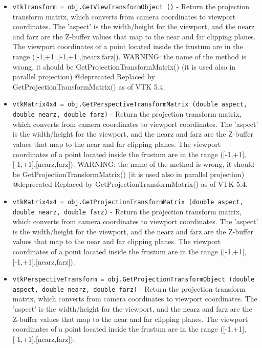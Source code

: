 \begin{itemize}
\item  \verb|vtkTransform = obj.GetViewTransformObject ()| -  Return the projection transform matrix, which converts from camera
 coordinates to viewport coordinates.  The 'aspect' is the
 width/height for the viewport, and the nearz and farz are the
 Z-buffer values that map to the near and far clipping planes.
 The viewport coordinates of a point located inside the frustum are in the
 range ([-1,+1],[-1,+1],[nearz,farz]).
 WARNING: the name of the method is wrong, it should be
 GetProjectionTransformMatrix() (it is used also in parallel projection)
 @deprecated Replaced by GetProjectionTransformMatrix() as of VTK 5.4.

\item  \verb|vtkMatrix4x4 = obj.GetPerspectiveTransformMatrix (double aspect, double nearz, double farz)| -  Return the projection transform matrix, which converts from camera
 coordinates to viewport coordinates.  The 'aspect' is the
 width/height for the viewport, and the nearz and farz are the
 Z-buffer values that map to the near and far clipping planes.
 The viewport coordinates of a point located inside the frustum are in the
 range ([-1,+1],[-1,+1],[nearz,farz]).
 WARNING: the name of the method is wrong, it should be
 GetProjectionTransformMatrix() (it is used also in parallel projection)
 @deprecated Replaced by GetProjectionTransformMatrix() as of VTK 5.4.

\item  \verb|vtkMatrix4x4 = obj.GetProjectionTransformMatrix (double aspect, double nearz, double farz)| -  Return the projection transform matrix, which converts from camera
 coordinates to viewport coordinates.  The 'aspect' is the
 width/height for the viewport, and the nearz and farz are the
 Z-buffer values that map to the near and far clipping planes.
 The viewport coordinates of a point located inside the frustum are in the
 range ([-1,+1],[-1,+1],[nearz,farz]).

\item  \verb|vtkPerspectiveTransform = obj.GetProjectionTransformObject (double aspect, double nearz, double farz)| -  Return the projection transform matrix, which converts from camera
 coordinates to viewport coordinates.  The 'aspect' is the
 width/height for the viewport, and the nearz and farz are the
 Z-buffer values that map to the near and far clipping planes.
 The viewport coordinates of a point located inside the frustum are in the
 range ([-1,+1],[-1,+1],[nearz,farz]).


\end{itemize}
